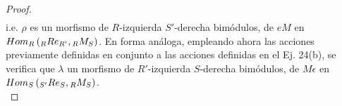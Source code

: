 \documentclass{article}
\newcommand{\lrprth}[1]{
	\left(#1\right)
}
\newcommand{\ringbimod}[4]{
	\if#4l
	{}_{#1-#2}#3
	\else
	\if#4r
	#3_{#1-#2}
	\else 
	\ifstrequal{#4}{lr}{
		{}_{#1}#3_{#2}
	}
	\fi
	\fi
}
\newcommand{\ringmodhom}[3]{
	Hom_{#1}\lrprth{#2,#3}
}
\theoremstyle{definition}
\theoremstyle{plain}
\theoremstyle{plain}
\theoremstyle{definition}
\theoremstyle{definition}
\theoremstyle{definition}
\theoremstyle{definition}
\theoremstyle{definition}
\theoremstyle{definition}
\begin{document}
\begin{enumerate}[label=\textbf{Ej \arabic*.}]
\begin{proof}
\begin{align*}
	\end{align*}
i.e. $\rho$ es un morfismo de $R$-izquierda $S'$-derecha bimódulos, de $eM$ en $\ringmodhom{R}{\ringbimod{R}{R'}{Re}{lr}}{\ringbimod{R}{S}{M}{lr}}$. En forma análoga, empleando ahora las acciones previamente definidas en conjunto a las acciones definidas en el Ej. 24(b), se verifica que $\lambda$ un morfismo de $R'$-izquierda $S$-derecha bimódulos, de $M\epsilon$ en $\ringmodhom{S}{\ringbimod{S'}{S}{Re}{lr}}{\ringbimod{R}{S}{M}{lr}}$.\\
\end{proof}
\end{enumerate}
\end{document}
